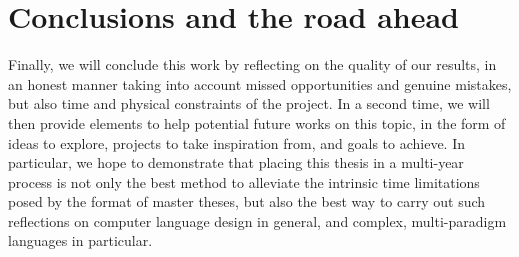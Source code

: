 \section{Conclusions and the road ahead}\label{sec:ch1-4}
Finally, we will conclude this work by reflecting on the quality of our results, in an honest manner taking into account missed opportunities and genuine mistakes, but also time and physical constraints of the project.
In a second time, we will then provide elements to help potential future works on this topic, in the form of ideas to explore, projects to take inspiration from, and goals to achieve.
In particular, we hope to demonstrate that placing this thesis in a multi-year process is not only the best method to alleviate the intrinsic time limitations posed by the format of master theses, but also the best way to carry out such reflections on computer language design in general, and complex, multi-paradigm languages in particular.
